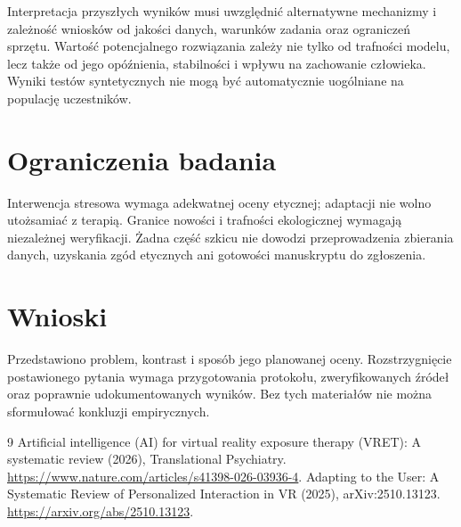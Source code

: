 \documentclass[11pt,a4paper]{article}
\begin{document}
Interpretacja przyszłych wyników musi uwzględnić alternatywne mechanizmy i zależność wniosków od jakości danych, warunków zadania oraz ograniczeń sprzętu. Wartość potencjalnego rozwiązania zależy nie tylko od trafności modelu, lecz także od jego opóźnienia, stabilności i wpływu na zachowanie człowieka. Wyniki testów syntetycznych nie mogą być automatycznie uogólniane na populację uczestników.

\section{Ograniczenia badania}

Interwencja stresowa wymaga adekwatnej oceny etycznej; adaptacji nie wolno utożsamiać z terapią. Granice nowości i trafności ekologicznej wymagają niezależnej weryfikacji. Żadna część szkicu nie dowodzi przeprowadzenia zbierania danych, uzyskania zgód etycznych ani gotowości manuskryptu do zgłoszenia.

\section{Wnioski}

Przedstawiono problem, kontrast i sposób jego planowanej oceny. Rozstrzygnięcie postawionego pytania wymaga przygotowania protokołu, zweryfikowanych źródeł oraz poprawnie udokumentowanych wyników. Bez tych materiałów nie można sformułować konkluzji empirycznych.

\begin{thebibliography}{9}
 Artificial intelligence (AI) for virtual reality exposure therapy (VRET): A systematic review (2026), Translational Psychiatry. \url{https://www.nature.com/articles/s41398-026-03936-4}.
 Adapting to the User: A Systematic Review of Personalized Interaction in VR (2025), arXiv:2510.13123. \url{https://arxiv.org/abs/2510.13123}.
\end{thebibliography}
\end{document}
